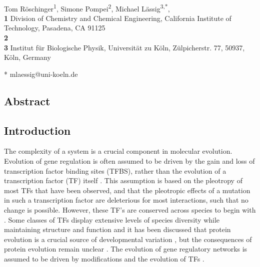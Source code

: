 \documentclass[10pt,a4paper]{article}
\date{}
\begin{document}
	\vspace*{0.2in}

	\begin{flushleft}
		{\Large
			\textbf{}
		}
		\newline
		\\
		Tom R\"oschinger\textsuperscript{1},
		Simone Pompei\textsuperscript{2},
		Michael L\"assig\textsuperscript{3,*},
		\\
		\bigskip
		\textbf{1} Division of Chemistry and Chemical Engineering, California Institute of Technology, Pasadena, CA 91125 \\
		\textbf{2} \\
		\textbf{3} Institut f\"ur Biologische Physik, Universit\"at zu K\"oln,
		Z\"ulpicherstr. 77, 50937, K\"oln, Germany
		\\
		\bigskip


		* mlaessig@uni-koeln.de

	\end{flushleft}
	
	
	\subsection*{Abstract}
	

	\subsection*{Introduction}
	The complexity of a system is a crucial component in molecular evolution. Evolution of gene regulation is often assumed to be driven by the gain and loss of transcription factor binding sites (TFBS), rather than the evolution of a transcription factor (TF) itself \cite{tugrul_dynamics_2015}. This assumption is based on the pleotropy of most TFs that have been observed, and that the pleotropic effects of a mutation in such a transcription factor are deleterious for most interactions, such that no change is possible. However, these TF's are conserved across species to begin with \cite{schmidt_five-vertebrate_2010}. Some classes of TFs display extensive levels of species diversity while maintaining structure and function \cite{nowick_lineage-specific_2010} and it has been discussed that protein evolution is a crucial source of developmental variation \cite{lynch_resurrecting_2008}, but the consequences of protein evolution remain unclear \cite{wagner_gene_2008, voordeckers_how_2015}. The evolution of gene regulatory networks is assumed to be driven by modifications 
	and the evolution of TFs \cite{lozada-chavez_bacterial_2006, perez_evolution_2009}.
	
\end{document}
